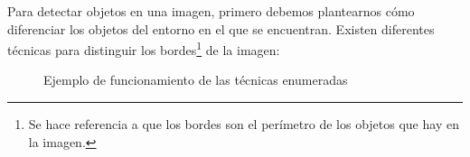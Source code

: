 Para detectar objetos en una imagen, primero debemos plantearnos cómo diferenciar los objetos del entorno en el que se encuentran. Existen diferentes técnicas para distinguir los bordes\footnote{Se hace referencia a que los bordes son el perímetro de los objetos que hay en la imagen.} de la imagen:

\begin{figure}[hbtp]
 \centering
 \caption{Ejemplo de funcionamiento de las técnicas enumeradas}
 \label{fig:AlgoritmosObjetos}
\end{figure}

